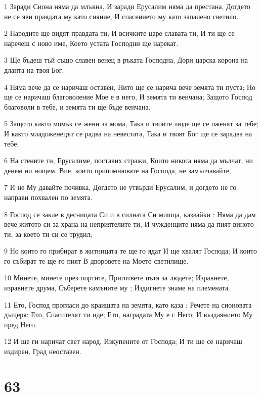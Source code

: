 \par 1 Заради Сиона няма да млъкна, И заради Ерусалим няма да престана, Догдето не се яви правдата му като сияние, И спасението му като запалено светило.
\par 2 Народите ще видят правдата ти, И всичките царе славата ти, И ти ще се наречеш с ново име, Което устата Господни ще нарекат.
\par 3 Ще бъдеш тъй също славен венец в ръката Господна, Дори царска корона на дланта на твоя Бог.
\par 4 Няма вече да се наричаш оставен, Нито ще се нарича вече земята ти пуста; Но ще се наричаш благоволение Мое е в него, И земята ти венчана; Защото Господ благоволи в тебе, и земята ти ще бъде венчана.
\par 5 Защото както момък се жени за мома, Така и твоите люде ще се оженят за тебе; И както младоженецът се радва на невестата, Така и твоят Бог ще се зарадва на тебе.
\par 6 На стените ти, Ерусалиме, поставих стражи, Които никога няма да мълчат, ни денем ни нощем. Вие, които припомнювате на Господа, не замълчавайте,
\par 7 И не Му давайте почивка, Догдето не утвърди Ерусалим, и догдето не го направи похвален по земята.
\par 8 Господ се закле в десницата Си и в силната Си мишца, казвайки : Няма да дам вече житото си за храна на неприятелите ти, И чужденците няма да пият виното ти, за което ти си се трудил;
\par 9 Но които го прибират в житницата те ще го ядат И ще хвалят Господа; И които го събират те ще го пият В дворовете на Моето светилище.
\par 10 Минете, минете през портите, Пригответе пътя за людете; Изравнете, изравнете друма, Съберете камъните му ; Издигнете знаме на племената.
\par 11 Ето, Господ прогласи до краищата на земята, като каза : Речете на сионовата дъщеря: Ето, Спасителят ти иде; Ето, наградата Му е с Него, И въздаянието Му пред Него.
\par 12 И ще ги наричат свет народ, Изкупените от Господа; И ти ще се наричаш издирен, Град неоставен.

\chapter{63}

